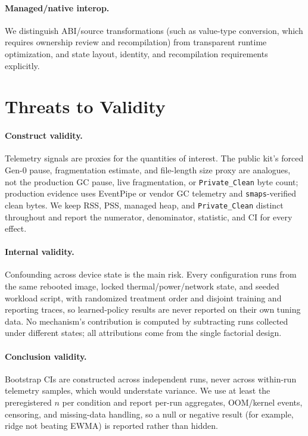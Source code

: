 \documentclass[acmsmall,screen]{acmart}
\begin{document}
\paragraph{Managed/native interop.}
We distinguish ABI/source transformations (such as value-type conversion,
which requires ownership review and recompilation) from transparent runtime
optimization, and state layout, identity, and recompilation requirements
explicitly.

\section{Threats to Validity}
\label{sec:threats}

\paragraph{Construct validity.}
Telemetry signals are proxies for the quantities of interest. The public
kit's forced Gen-0 pause, fragmentation estimate, and file-length size proxy
are analogues, not the production GC pause, live fragmentation, or
\texttt{Private\_Clean} byte count; production evidence uses EventPipe or
vendor GC telemetry and \texttt{smaps}-verified clean bytes. We keep RSS,
PSS, managed heap, and \texttt{Private\_Clean} distinct throughout and report
the numerator, denominator, statistic, and CI for every effect.

\paragraph{Internal validity.}
Confounding across device state is the main risk. Every configuration runs
from the same rebooted image, locked thermal/power/network state, and seeded
workload script, with randomized treatment order and disjoint training and
reporting traces, so learned-policy results are never reported on their own
tuning data. No mechanism's contribution is computed by subtracting runs
collected under different states; all attributions come from the single
factorial design.

\paragraph{Conclusion validity.}
Bootstrap CIs are constructed across independent runs, never across
within-run telemetry samples, which would understate variance. We use at
least the preregistered $n$ per condition and report per-run aggregates,
OOM/kernel events, censoring, and missing-data handling, so a null or
negative result (for example, ridge not beating EWMA) is reported rather
than hidden.
\end{document}
